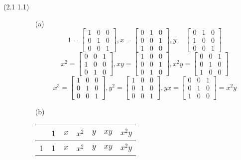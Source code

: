 \begin{description}
\item[(2.1 {\color{cBlue} 1.1})]
\begin{itemize}
\item[(a)]
$$1 = \begin{bmatrix}
1 & 0 & 0 \\
0 & 1 & 0 \\
0 & 0 & 1
\end{bmatrix}, x = \begin{bmatrix}
0 & 1 & 0 \\
0 & 0 & 1 \\
1 & 0 & 0
\end{bmatrix}, y = \begin{bmatrix}
0 & 1 & 0 \\
1 & 0 & 0 \\
0 & 0 & 1
\end{bmatrix}$$
$$x^2 = \begin{bmatrix}
0 & 0 & 1 \\
1 & 0 & 0 \\
0 & 1 & 0
\end{bmatrix}, xy = \begin{bmatrix}
1 & 0 & 0 \\
0 & 0 & 1 \\
0 & 1 & 0
\end{bmatrix}, x^2y = \begin{bmatrix}
0 & 0 & 1 \\
0 & 1 & 0 \\
1 & 0 & 0
\end{bmatrix}$$
$$x^3 = \begin{bmatrix}
1 & 0 & 0 \\
0 & 1 & 0 \\
0 & 0 & 1
\end{bmatrix}, y^2 = \begin{bmatrix}
1 & 0 & 0 \\
0 & 1 & 0 \\
0 & 0 & 1
\end{bmatrix}, yx = \begin{bmatrix}
0 & 0 & 1 \\
0 & 1 & 0 \\
1 & 0 & 0
\end{bmatrix} = x^2y$$
\item[(b)]
\begin{tabular}{| c || c | c | c | c | c | c |}
\hline
& 1 & $x$ & $x^2$ & $y$ & $xy$ & $x^2y$ \\
\hline \hline
1 & 1 & $x$ & $x^2$ & $y$ & $xy$ & $x^2y$ \\

\end{tabular}
\end{itemize}
\end{description}
